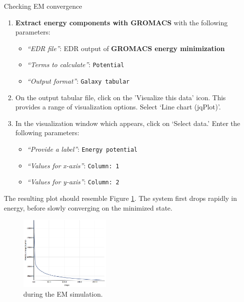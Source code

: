 \documentclass[twocolumn]{bmcart}%
\providecommand{\tightlist}{%
  \setlength{\itemsep}{0pt}\setlength{\parskip}{0pt}}
\begin{document}
\begin{handson_box_colour}{Checking EM convergence}
\begin{enumerate}
\def\labelenumi{\arabic{enumi}.}
\tightlist
\item
  \textbf{Extract energy components with GROMACS} with the following parameters:

  \begin{itemize}
  \tightlist
  \item
    \emph{``EDR file''}: EDR output of
    \textbf{GROMACS energy minimization}
  \item
    \emph{``Terms to calculate''}: \texttt{Potential}
  \item
    \emph{``Output format''}:
    \texttt{Galaxy tabular}

  \end{itemize}
\item
  On the output tabular file, click on the 'Visualize this data' icon. This provides a range of visualization options. Select `Line chart (jqPlot)'.
\item
  In the visualization window which appears, click on `Select data.' Enter the following parameters:
  \begin{itemize}
  \tightlist
  \item
    \emph{``Provide a label''}: \texttt{Energy potential}
  \item
    \emph{``Values for x-axis''}: \texttt{Column: 1}
  \item
    \emph{``Values for y-axis''}: \texttt{Column: 2}
  \end{itemize}
\end{enumerate}

\end{handson_box_colour}

The resulting plot should resemble Figure \ref{fig:empot}. The system first drops rapidly in energy, before slowly converging on the minimized state.

\begin{figure}[ht!]
  \includegraphics[width=0.4\textwidth]{em_potential}
  \caption{
       during the EM simulation.}
  \label{fig:empot}
\end{figure}
\end{document}
